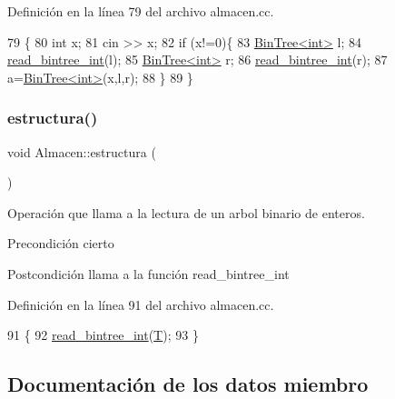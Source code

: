 Definición en la línea 79 del archivo almacen.\+cc.


\begin{DoxyCode}
79                                               \{
80   \textcolor{keywordtype}{int} x;
81   cin >> x;
82   \textcolor{keywordflow}{if} (x!=0)\{
83   \mbox{\hyperlink{class_bin_tree}{BinTree<int>}} l;
84   \mbox{\hyperlink{class_almacen_afd1437f2b2157c3eb63321c467d4a8f2}{read\_bintree\_int}}(l);
85   \mbox{\hyperlink{class_bin_tree}{BinTree<int>}} r;
86   \mbox{\hyperlink{class_almacen_afd1437f2b2157c3eb63321c467d4a8f2}{read\_bintree\_int}}(r);
87   a=\mbox{\hyperlink{class_bin_tree}{BinTree<int>}}(x,l,r);
88   \}
89 \}
\end{DoxyCode}
\mbox{\label{class_almacen_a184cbc0f9e316534ecc04edc0bc895f1}} 
\subsubsection{\texorpdfstring{estructura()}{estructura()}}
{\footnotesize\ttfamily void Almacen\+::estructura (\begin{DoxyParamCaption}{ }\end{DoxyParamCaption})}



Operación que llama a la lectura de un arbol binario de enteros. 

\begin{DoxyPrecond}{Precondición}
cierto 
\end{DoxyPrecond}
\begin{DoxyPostcond}{Postcondición}
llama a la función read\+\_\+bintree\+\_\+int 
\end{DoxyPostcond}


Definición en la línea 91 del archivo almacen.\+cc.


\begin{DoxyCode}
91                          \{
92   \mbox{\hyperlink{class_almacen_afd1437f2b2157c3eb63321c467d4a8f2}{read\_bintree\_int}}(\mbox{\hyperlink{class_almacen_a15cd94a2b5bf5f5863b458eec53c9fd4}{T}});
93 \}
\end{DoxyCode}


\subsection{Documentación de los datos miembro}
\mbox{\label{class_almacen_a15cd94a2b5bf5f5863b458eec53c9fd4}} 
